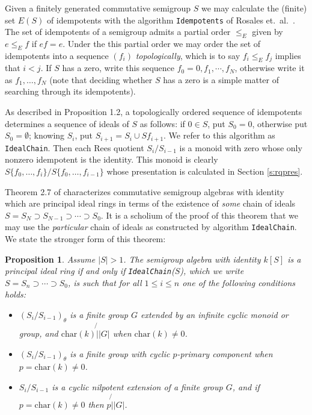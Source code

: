 \documentclass[12pt]{article}
\def\char{{\mbox{char}}}
\newtheorem{proposition}{\qquad\bf Proposition}
\begin{document}
Given a finitely generated commutative semigroup $S$ we
may calculate the (finite) set $E(S)$ of idempotents with the algorithm
{\tt Idempotents} of Rosales et.~al.~\cite{pRGG99}. 
The set of idempotents of a semigroup admits a partial order
$\leq_E$ given by $e \leq_E f$ if $ef = e$.
Under the this partial order we may order the set of idempotents
into a sequence $(f_i)$ {\em topologically}, which is to 
say $f_i \leq_E f_j$ implies that $i < j$. 
If $S$ has a zero, write this sequence $f_0 = 0, f_1, \cdots, f_N$,
otherwise write it as $f_1, \ldots, f_N$
(note that deciding whether $S$ has a zero is a simple matter of 
searching through its idempotents).

As described in \cite{pDJW91} Proposition 1.2,  a  topologically 
ordered sequence of idempotents determines a sequence of ideals
of $S$ as follows:
if $0 \in S$, put $S_0 = {0}$, otherwise put $S_0 = \emptyset$; 
knowing $S_i$, put $S_{i+1} = S_i \cup S f_{i+1}$. We refer to this
algorithm as {\tt IdealChain}.  Then
each Rees quotient $S_i/S_{i-1}$ is a monoid with zero whose only
nonzero idempotent is the identity. This monoid is clearly
$S\{f_0, \ldots, f_i\} / S\{f_0, \ldots, f_{i-1}\}$ whose 
presentation is calculated in Section \ref{s:rqpres}.
 
Theorem 2.7 of \cite{pDJW91} characterizes commutative semigroup
algebras with identity 
which are principal ideal rings  in terms of the existence of 
{\em some} chain of ideals $S = S_N \supset S_{N-1} 
\supset \cdots \supset S_0$. 
It is a scholium of the proof of this theorem that 
we may use the {\em particular} chain of ideals as constructed by
algorithm  {\tt IdealChain}. We state the stronger form of this 
theorem:

\begin{proposition}\label{p:djwthm}
Assume $|S| > 1$. The semigroup algebra with identity $k[S]$ is a
principal ideal ring if and only if {\tt IdealChain}($S$),
which we write $S=S_n \supset \cdots \supset S_0$, is
such that for all $1 \leq i \leq n$ one of the following conditions
holds:
\begin{itemize}
\item[(i)] 
$(S_i/ S_{i-1})_\theta$ is a finite group $G$ extended by an
infinite cyclic monoid or group, and $\char(k) \not{|} |G|$ when
$\char(k) \neq 0$. 
\item[(ii)] 
$(S_i/ S_{i-1})_\theta$ is a finite group with 
cyclic $p$-primary component when $p = \char(k) \neq 0$.
\item[(iii)] 
$S_i/ S_{i-1}$ is a cyclic nilpotent extension of a
finite group $G$, and if $p  = \char(k) \neq 0$ then
$p  \not{|} |G|$. 
\end{itemize}
\end{proposition}
\end{document}
